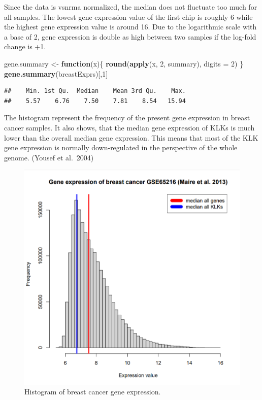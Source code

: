 \documentclass[
]{article}
\newenvironment{Shaded}{\begin{snugshade}}{\end{snugshade}}
\newcommand{\ControlFlowTok}[1]{\textcolor[rgb]{0.13,0.29,0.53}{\textbf{#1}}}
\newcommand{\DataTypeTok}[1]{\textcolor[rgb]{0.13,0.29,0.53}{#1}}
\newcommand{\DecValTok}[1]{\textcolor[rgb]{0.00,0.00,0.81}{#1}}
\newcommand{\KeywordTok}[1]{\textcolor[rgb]{0.13,0.29,0.53}{\textbf{#1}}}
\newcommand{\NormalTok}[1]{#1}
\newcommand{\StringTok}[1]{\textcolor[rgb]{0.31,0.60,0.02}{#1}}
\begin{document}
Since the data is vsnrma normalized, the median does not fluctuate too
much for all samples. The lowest gene expression value of the first chip
is roughly 6 while the highest gene expression value is around 16. Due
to the logarithmic scale with a base of 2, gene expression is double as
high between two samples if the log-fold change is +1.

\begin{Shaded}
\begin{Highlighting}[]
\NormalTok{gene.summary <-}\StringTok{ }\ControlFlowTok{function}\NormalTok{(x)\{}
 \KeywordTok{round}\NormalTok{(}\KeywordTok{apply}\NormalTok{(x, }\DecValTok{2}\NormalTok{, summary), }\DataTypeTok{digits =} \DecValTok{2}\NormalTok{)}
\NormalTok{\}}
\KeywordTok{gene.summary}\NormalTok{(breastExprs)[,}\DecValTok{1}\NormalTok{]}
\end{Highlighting}
\end{Shaded}

\begin{verbatim}
##    Min. 1st Qu.  Median    Mean 3rd Qu.    Max. 
##    5.57    6.76    7.50    7.81    8.54   15.94
\end{verbatim}

The histogram represent the frequency of the present gene expression in
breast cancer samples. It also shows, that the median gene expression of
KLKs is much lower than the overall median gene expression. This means
that most of the KLK gene expression is normally down-regulated in the
perspective of the whole genome. (Yousef et al.~2004)

\begin{figure}

{\centering \includegraphics[width=0.5\linewidth]{images/Histogram_breast} 

}

\caption{Histogram of breast cancer gene expression.}\label{fig:Histogram - breast }
\end{figure}
\end{document}

